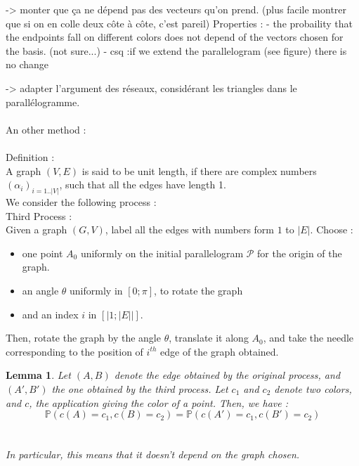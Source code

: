 \documentclass[a4paper,11pt]{article}
\newtheorem{lemma}{Lemma}
\begin{document}
-> monter que ça ne dépend pas des vecteurs qu'on prend. (plus facile montrer que si on en colle deux côte à côte, c'est pareil)
	Properties : 
	 - the probaility that the endpoints fall on different colors does not depend of the vectors chosen for the basis. (not sure...)
	 - csq :if we extend the parallelogram (see figure) there is no change
	 

	-> adapter l'argument des réseaux, considérant les triangles dans le parallélogramme.
\\
\\
An other method : \\
\\
Definition : \\ 
A graph $(V,E) $ is said to be unit length, if there are complex numbers $(\alpha_i)_{i=1..|V|}$, such that all the edges have length 1.
\\

We consider the following process : \\
Third Process : \\
Given a graph $(G,V)$, label all the edges with numbers form $1$ to $|E|$. Choose : \\
\begin{itemize}
\item one point $A_0$ uniformly on the initial parallelogram $\mathcal{P}$ for the origin of the graph.
\item an angle $\theta$ uniformly in $[0;\pi]$, to rotate the graph
\item and an index $i$ in $[|1;|E||]$.
\end{itemize}
Then, rotate the graph by the angle $\theta$, translate it along $A_0$, and take the needle corresponding to the position of $i^{th}$ edge of the graph obtained. \\
\vspace{1 cm} 

\begin{lemma}
Let $(A,B)$ denote the edge obtained by the original process, and $(A',B')$ the one obtained by the third process. Let $c_1$ and $c_2$ denote two colors, and $c$, the application giving the color of a point. Then, we have :\\
 $$\mathbb{P}(c(A) = c_1 , c(B) = c_2) = \mathbb{P}(c(A') = c_1, c(B') = c_2) $$ \\
 \\
 In particular, this means that it doesn't depend on the graph chosen.
\end{lemma}
\end{document}
